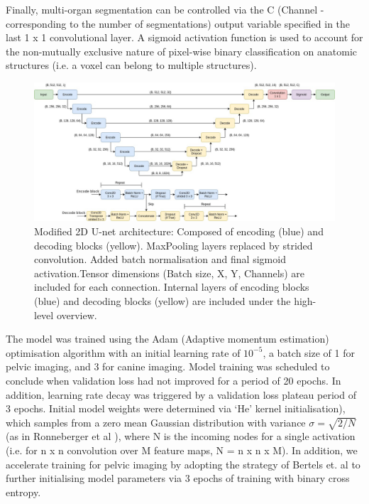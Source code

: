 Finally, multi-organ segmentation can be controlled via the C (Channel - corresponding to the number of segmentations) output variable specified in the last 1 x 1 convolutional layer. A sigmoid activation function is used to account for the non-mutually exclusive nature of pixel-wise binary classification on anatomic structures (i.e. a voxel can belong to multiple structures).

\begin{figure}[!htb]
	\begin{center}
		\hspace*{-1.3cm}\includegraphics[width=1.15\textwidth]{figures/model_diagram}
		\caption{Modified 2D U-net architecture: Composed of encoding (blue) and decoding blocks (yellow). MaxPooling layers replaced by strided convolution. Added batch normalisation and final sigmoid activation.Tensor dimensions (Batch size, X, Y, Channels) are included for each connection. Internal layers of encoding blocks (blue) and decoding blocks (yellow) are included under the high-level overview.}
		\label{fig:model}
	\end{center}
\end{figure}

The model was trained using the Adam (Adaptive momentum estimation) optimisation algorithm \cite{kingma2014} with an initial learning rate of $10^{-5}$, a batch size of 1 for pelvic imaging, and 3 for canine imaging. Model training was scheduled to conclude when validation loss had not improved for a period of 20 epochs. In addition, learning rate decay was triggered by a validation loss plateau period of 3 epochs. Initial model weights were determined via `He' kernel initialisation), which samples from a zero mean Gaussian distribution with variance $\sigma=\sqrt{2/N}$ (as in Ronneberger et al \cite{Ronneberger_2015}), where N is the incoming nodes for a single activation (i.e. for n x n convolution over M feature maps, N = n x n x M). In addition, we accelerate training for pelvic imaging by adopting the strategy of Bertels et. al to further initialising model parameters via 3 epochs of training with binary cross entropy.



